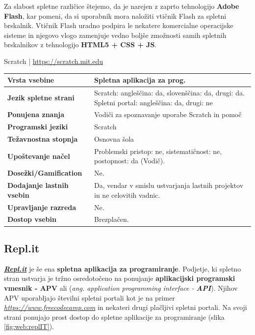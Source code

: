 Za slabost spletne različice štejemo, da je narejen z zaprto
tehnologijo \textbf{Adobe Flash}, kar pomeni, da si uporabnik mora
naložiti vtičnik Flash za spletni brskalnik. Vtičnik Flash uradno
podpira le nekatere komercialne operacijske sisteme in njegovo vlogo
zamenjuje vedno boljše zmožnosti samih spletnih brskalnikov z
tehnologijo \textbf{HTML5 + CSS + JS}.

\begin{osebnabox}[label={osebna:scratch}]{Scratch | \url{https://scratch.mit.edu}}
    \begin{tabular}{
  p{} |
  p{}  }
  \textbf{Vrsta vsebine} & Spletna aplikacija za prog. \\
      \hline
  \textbf{Jezik spletne strani} & Scratch: angleščina: da, slovenščina: da,
                                  drugi: da. Spletni portal:
                                  angleščina: da, drugi: ne\\
      \hline
  \textbf{Ponujena znanja} & Vodiči za spoznavanje uporabe Scratch in pomoč \\
      \hline
 \textbf{Programski jeziki} & Scratch \\
      \hline
  \textbf{Težavnostna stopnja} & Osnovna šola \\
      \hline
   \textbf{Upoštevanje načel} & Problemski pristop: ne,
                                sistematičnost: ne, postopnost: da (Vodič). \\
      \hline
  \textbf{Dosežki/Gamification} & Ne. \\
      \hline
  \textbf{Dodajanje lastnih vsebin} & Da, vendar v smislu ustvarjanja
                                      lastnih projektov in ne
                                      celovitih vadnic. \\
      \hline
  \textbf{Upravljanje razreda} & Ne. \\
      \hline
  \textbf{Dostop vsebin} & Brezplačen. \\
\end{tabular}
\end{osebnabox}

\subsection{Repl.it}
\label{sec:repl.it}

\textbf{\emph{\href{https://repl.it/}{Repl.it}}} \cite{web:replIT} je še ena
\textbf{spletna aplikacija za programiranje}. Podjetje, ki spletno
stran ustvarja je tržno osredotočeno na ponujanje \textbf{aplikacijski
  programski vmesnik - APV} ali (\emph{ang. application programming
  interface - \textbf{API}}). Njihov APV uporabljajo številni spletni
portali kot je na primer
\emph{\href{freecodecamp}{https://www.freecodecamp.com}}
\cite{web:freecodecamp} in nekateri drugi plačljivi spletni
portali. Na svoji strani ponujajo prost dostop do spletne aplikacije
za programiranje (slika \ref{fig:web:replIT}).

